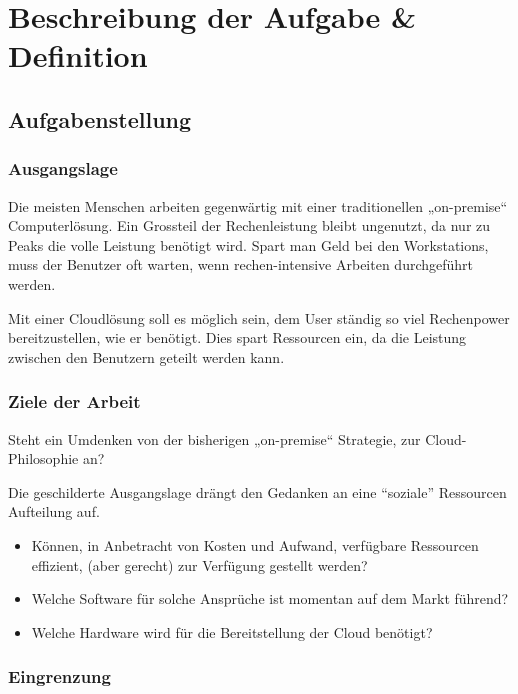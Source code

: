 \chapter{Beschreibung der Aufgabe \& Definition}

\section{Aufgabenstellung}


\subsection{Ausgangslage}
Die meisten Menschen arbeiten gegenwärtig mit einer traditionellen „on-premise“ Computerlösung.
Ein Grossteil der Rechenleistung bleibt ungenutzt, da nur zu Peaks die volle Leistung benötigt wird.
Spart man Geld bei den Workstations, muss der Benutzer oft warten, wenn rechen-intensive Arbeiten durchgeführt werden. 

Mit einer Cloudlösung soll es möglich sein, dem User ständig so viel Rechenpower bereitzustellen, wie er benötigt.
Dies spart Ressourcen ein, da die Leistung zwischen den Benutzern geteilt werden kann.

\subsection{Ziele der Arbeit}
Steht ein Umdenken von der bisherigen „on-premise“ Strategie, zur Cloud-Philosophie an?

Die geschilderte Ausgangslage drängt den Gedanken an eine “soziale” Ressourcen Aufteilung auf.

\begin{itemize}
	\item Können, in Anbetracht von Kosten und Aufwand, verfügbare Ressourcen effizient, (aber gerecht) zur Verfügung gestellt werden?
	\item Welche Software für solche Ansprüche ist momentan auf dem Markt führend?
	\item Welche Hardware wird für die Bereitstellung der Cloud benötigt?
\end{itemize}



\subsection{Eingrenzung}

